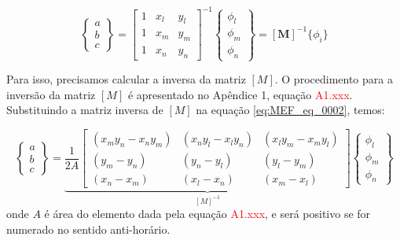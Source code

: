\documentclass[
12pt,
a4paper,
oneside,
chapter=TITLE,
sumario=tradicional
]{abntex2}
\begin{document}
    \begin{equation}
    \begin{Bmatrix}
    	a \\
    	b \\
    	c
    \end{Bmatrix}
    =
    \begin{bmatrix}
    	1 & x_l & y_l \\
    	1 & x_m & y_m \\
    	1 & x_n & y_n
    \end{bmatrix}^{-1}
    \begin{Bmatrix}
    	\phi_{l} \\
    	\phi_{m} \\
    	\phi_{n}
    \end{Bmatrix}
    =
    [\mathbf{M}]^{-1} \{ \phi_{i} \}
    \label{eq:MEF_eq_0002}   
    \end{equation}

    Para isso, precisamos calcular a inversa da matriz $[M]$. O procedimento para a inversão da matriz $[M]$ é apresentado no Apêndice 1, equação \textcolor{red}{A1.xxx}. Substituindo a matriz inversa de $[M]$ na equação \ref{eq:MEF_eq_0002}, temos:
    
    \begin{equation}
    \begin{Bmatrix}
    	a \\
    	b \\
    	c
    \end{Bmatrix} =
    \underbrace{
    	\frac{1}{2A}
    	\begin{bmatrix}
    		(x_m y_n - x_n y_m) & (x_n y_l - x_l y_n) & (x_l y_m - x_m y_l) \\
    		(y_m - y_n) & (y_n - y_l) & (y_l - y_m) \\
    		(x_n - x_m) & (x_l - x_n) & (x_m - x_l)
    \end{bmatrix}}_{[M]^{-1}}
    \begin{Bmatrix}
    	\phi_{l} \\
    	\phi_{m} \\
    	\phi_{n}
    \end{Bmatrix}
    \label{eq:MEF_eq_0003} 
	\end{equation}
    onde $A$ é área do elemento dada pela equação \textcolor{red}{A1.xxx}, e será positivo se for numerado no sentido anti-horário.
    
\end{document}
